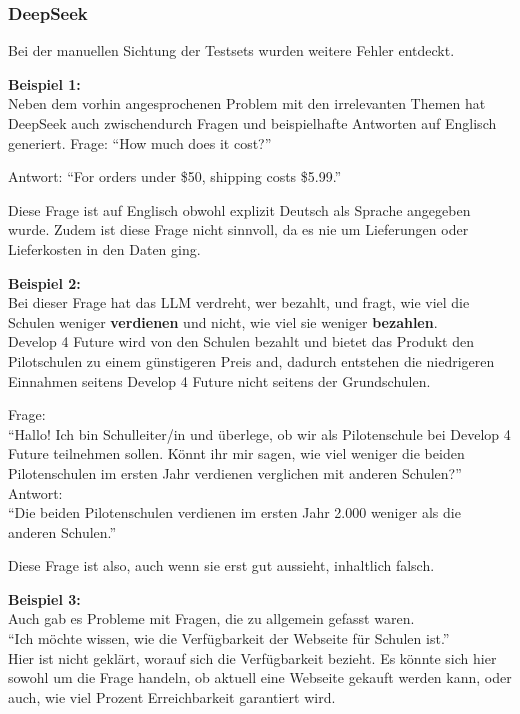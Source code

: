 \subsubsection{DeepSeek}

Bei der manuellen Sichtung der Testsets wurden weitere Fehler entdeckt.

\textbf{Beispiel 1:}\\
Neben dem vorhin angesprochenen Problem mit den irrelevanten Themen hat DeepSeek auch zwischendurch Fragen und beispielhafte Antworten auf Englisch generiert.
Frage:
\enquote{How much does it cost?}

Antwort:
\enquote{For orders under \$50, shipping costs \$5.99.}

Diese Frage ist auf Englisch obwohl explizit Deutsch als Sprache angegeben wurde. Zudem ist diese Frage nicht sinnvoll, da es nie um Lieferungen oder Lieferkosten in den Daten ging.

\textbf{Beispiel 2:}\\
Bei dieser Frage hat das LLM verdreht, wer bezahlt, und fragt, wie viel die Schulen weniger \textbf{verdienen} und nicht, wie viel sie weniger \textbf{bezahlen}.\\
Develop 4 Future wird von den Schulen bezahlt und bietet das Produkt den Pilotschulen zu einem günstigeren Preis and, dadurch entstehen die niedrigeren Einnahmen seitens Develop 4 Future nicht seitens der Grundschulen.

Frage:\\
\enquote{Hallo! Ich bin Schulleiter/in und überlege, ob wir als Pilotenschule bei Develop 4 Future teilnehmen sollen. Könnt ihr mir sagen, wie viel weniger die beiden Pilotenschulen im ersten Jahr verdienen verglichen mit anderen Schulen?}\\

Antwort:\\
\enquote{Die beiden Pilotenschulen verdienen im ersten Jahr 2.000 \texteuro{} weniger als die anderen Schulen.}

Diese Frage ist also, auch wenn sie erst gut aussieht, inhaltlich falsch.

\textbf{Beispiel 3:}\\
Auch gab es Probleme mit Fragen, die zu allgemein gefasst waren.\\
\enquote{Ich möchte wissen, wie die Verfügbarkeit der Webseite für Schulen ist.}\\
Hier ist nicht geklärt, worauf sich die Verfügbarkeit bezieht. Es könnte sich hier sowohl um die Frage handeln, ob aktuell eine Webseite gekauft werden kann, oder auch, wie viel Prozent Erreichbarkeit garantiert wird.

